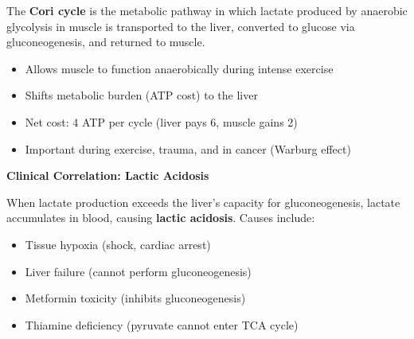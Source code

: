 \begin{definition}
The \textbf{Cori cycle} is the metabolic pathway in which lactate produced by anaerobic glycolysis in muscle is transported to the liver, converted to glucose via gluconeogenesis, and returned to muscle.
\end{definition}

\begin{center}
\end{center}

\begin{itemize}
    \item Allows muscle to function anaerobically during intense exercise
    \item Shifts metabolic burden (ATP cost) to the liver
    \item Net cost: 4 ATP per cycle (liver pays 6, muscle gains 2)
    \item Important during exercise, trauma, and in cancer (Warburg effect)
\end{itemize}

\begin{clinmark}
\textbf{Clinical Correlation: Lactic Acidosis}

When lactate production exceeds the liver's capacity for gluconeogenesis, lactate accumulates in blood, causing \textbf{lactic acidosis}. Causes include:
\begin{itemize}
    \item Tissue hypoxia (shock, cardiac arrest)
    \item Liver failure (cannot perform gluconeogenesis)
    \item Metformin toxicity (inhibits gluconeogenesis)
    \item Thiamine deficiency (pyruvate cannot enter TCA cycle)
\end{itemize}
\end{clinmark}

